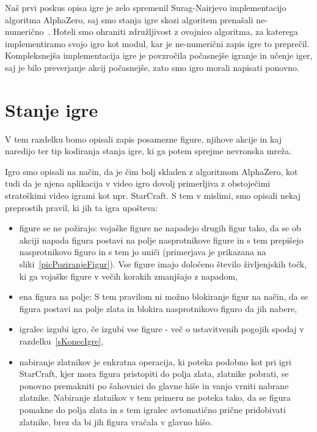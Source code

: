 \documentclass[a4paper, 12pt]{book}
\begin{document}
Naš prvi poskus opisa igre je zelo spremenil Surag-Nairjevo implementacijo algoritma AlphaZero, saj smo stanja igre skozi algoritem prenašali ne-numerično~\cite{objectAlphaZero}.
Hoteli smo ohraniti združljivost z ovojnico algoritma, za katerega implementiramo svojo igro kot modul, kar je ne-numerični zapis igre to preprečil.
Kompleksnejša implementacija igre je povzročila počasnejše igranje in učenje iger, saj je bilo preverjanje akcij počasnejše, zato smo igro morali napisati ponovno.

\section{Stanje igre}
\label{stanjeigre}
V tem razdelku bomo opisali zapis posamezne figure, njihove akcije in kaj naredijo ter tip kodiranja stanja igre, ki ga potem sprejme nevronska mreža.

Igro smo opisali na način, da je čim bolj skladen z algoritmom AlphaZero, kot tudi da je njena aplikacija v video igro dovolj primerljiva z obstoječimi strateškimi video igrami kot npr. StarCraft.
S tem v mislimi, smo opisali nekaj preprostih pravil, ki jih ta igra upošteva:
\begin{itemize}
	\item figure se ne požirajo: vojaške figure ne napadejo drugih figur tako, da se ob akciji napada figura postavi na polje nasprotnikove figure in s tem prepišejo nasprotnikovo figuro in s tem jo uniči (primerjava je prikazana na sliki~\ref{picPoziranjeFigur}). 
	Vse figure imajo določeno število življenjskih točk, ki ga vojaške figure v večih korakih zmanjšajo z napadom,
	\item ena figura na polje: S tem pravilom ni možno blokiranje figur na način, da se figura postavi na polje zlata in blokira nasprotnikovo figuro da jih nabere,
	\item igralec izgubi igro, če izgubi vse figure - več o ustavitvenih pogojih spodaj v razdelku~\ref{sKonecIgre},
	\item nabiranje zlatnikov je enkratna operacija, ki poteka podobno kot pri igri StarCraft, kjer mora figura pristopiti do polja zlata, zlatnike pobrati, se ponovno premakniti po šahovnici do glavne hiše in vanjo vrniti nabrane zlatnike.
	Nabiranje zlatnikov v tem primeru ne poteka tako, da se figura pomakne do polja zlata in s tem igralec avtomatično prične pridobivati zlatnike, brez da bi jih figura vračala v glavno hišo.
\end{itemize}
\end{document}
